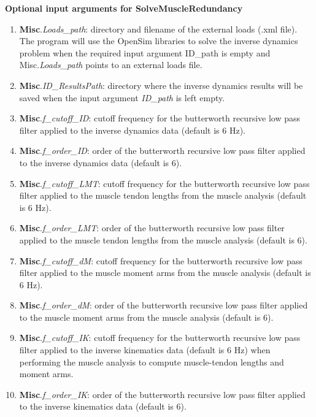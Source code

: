 \documentclass[a4paper,oneside,11pt]{article}
\begin{document}
\textbf{Optional input arguments for SolveMuscleRedundancy}
\begin{enumerate}
	\item \textbf{Misc}.\textit{Loads_path}: directory and filename of the external loads (.xml file). The program will use the OpenSim libraries to solve the inverse dynamics problem when the required input argument ID_path is empty and Misc.\textit{Loads_path} points to an external loads file.
	
	\item \textbf{Misc}.\textit{ID_ResultsPath}: directory where the inverse dynamics results will be saved when the input argument \textit{ID_path} is left empty.
	
	\item \textbf{Misc}.\textit{f_cutoff_ID}: cutoff frequency for the butterworth recursive low pass filter applied to the inverse dynamics data (default is 6 Hz).
	
	\item \textbf{Misc}.\textit{f_order_ID}: order of the butterworth recursive low pass filter applied to the inverse dynamics data (default is 6).
	
	\item \textbf{Misc}.\textit{f_cutoff_LMT}: cutoff frequency for the butterworth recursive low pass filter applied to the muscle tendon lengths from the muscle analysis (default is 6 Hz).
	
	\item \textbf{Misc}.\textit{f_order_LMT}: order of the butterworth recursive low pass filter applied to the muscle tendon lengths from the muscle analysis (default is 6).		
	
	\item \textbf{Misc}.\textit{f_cutoff_dM}: cutoff frequency for the butterworth recursive low pass filter applied to the muscle moment arms from the muscle analysis (default is 6 Hz).
	
	\item \textbf{Misc}.\textit{f_order_dM}: order of the butterworth recursive low pass filter applied to the muscle moment arms from the muscle analysis (default is 6).

	\item \textbf{Misc}.\textit{f_cutoff_IK}: cutoff frequency for the butterworth recursive low pass filter applied to the inverse kinematics data (default is 6 Hz) when performing the muscle analysis to compute muscle-tendon lengths and moment arms.
	
	\item \textbf{Misc}.\textit{f_order_IK}: order of the butterworth recursive low pass filter applied to the inverse kinematics data (default is 6).


\end{enumerate}
\end{document}
